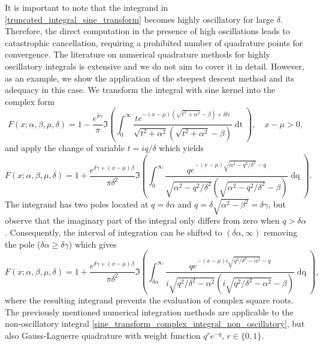 \documentclass[10pt,a4paper,oneside]{article}
\numberwithin{equation}{section}
\begin{document}
It is important to note that the integrand in \eqref{truncated_integral_sine_transform} becomes highly oscillatory for large $\delta$. Therefore, the direct computation in the presence of high oscillations leads to catastrophic cancellation, requiring a prohibited number of quadrature points for convergence. The literature on numerical quadrature methods for highly oscillatory integrals is extensive and we do not aim to cover it in detail. However, as an example, we show the application of the steepest descent method and its adequacy in this case. We transform the integral with sine kernel into the complex form
\begin{equation}\label{sine_transform_complex_integral}
F(x; \alpha, \beta, \mu, \delta) = 1 - \frac{e^{\delta \gamma}}{\pi}\Im\left(\int_0^{\infty} \frac{t e^{-(x-\mu)\left(\sqrt{t^2 + \alpha^2} - \beta\right) + \delta t i}}{\sqrt{t^2 + \alpha^2}\left(\sqrt{t^2 + \alpha^2} - \beta\right)}\mathop{dt}\right), \quad x-\mu > 0,
\end{equation}
and apply the change of variable $t = i q / \delta$ which yields
\begin{equation}
F(x; \alpha, \beta, \mu, \delta) = 1 + \frac{e^{\delta \gamma + (x-\mu) \beta}}{\pi \delta^2} \Im\left(\int_{0}^{\infty} \frac{q e^{-(x-\mu)\sqrt{\alpha^2 - q^2/\delta^2} - q}}{\sqrt{\alpha^2 - q^2/\delta^2}\left(\sqrt{\alpha^2 - q^2/\delta^2} -\beta\right)} \mathop{dq}\right).
\end{equation}
The integrand has two poles located at $q = \delta \alpha$ and $q = \delta\sqrt{\alpha^2 - \beta^2} = \delta \gamma$, but observe that the imaginary part of the integral only differs from zero when $q > \delta \alpha$. Consequently, the interval of integration can be shifted to $(\delta \alpha, \infty)$ removing the pole ($\delta \alpha \ge \delta \gamma$) which gives
\begin{equation}\label{sine_transform_complex_integral_non_oscillatory}
F(x; \alpha, \beta, \mu, \delta) = 1 + \frac{e^{\delta \gamma + (x-\mu) \beta}}{\pi \delta^2} \Im\left(\int_{\delta\alpha}^{\infty} \frac{q e^{-(x-\mu)i\sqrt{q^2/\delta^2 - \alpha^2} - q}}{i\sqrt{q^2/\delta^2 - \alpha^2}\left(i\sqrt{q^2/\delta^2 - \alpha^2} -\beta\right)} \mathop{dq}\right),
\end{equation}
where the resulting integrand prevents the evaluation of complex square roots. The previously mentioned numerical integration methods are applicable to the non-oscillatory integral \eqref{sine_transform_complex_integral_non_oscillatory}, but also Gauss-Laguerre quadrature with weight function $q^r e^{-q}$, $r \in \{0, 1\}$.
\end{document}
